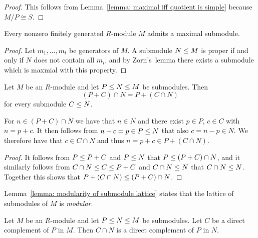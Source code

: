 \begin{proof}
  This follows from Lemma~\ref{lemma: maximal iff quotient is simple} because $M/P \cong S$.
\end{proof}


\begin{lemma}
  \label{lemma: fg modules contain max submodules}
  Every nonzero finitely generated $R$-module $M$ admits a maximal submodule.
\end{lemma}


\begin{proof}
  Let $m_1, \dotsc, m_t$ be generators of $M$.
  A submodule $N \leq M$ is proper if and only if $N$ does not contain all $m_i$, and by Zorn’s~lemma there exists a submodule which is maxmial with this property.
\end{proof}


\begin{lemma}
  \label{lemma: modularity of submodule lattice}
  Let $M$ be an $R$-module and let $P \leq N \leq M$ be submodules.
  Then
  \[
      (P + C) \cap N
    = P + (C \cap N)
  \]
  for every submodule $C \leq N$.
  
  For $n \in (P + C) \cap N$ we have that $n \in N$ and there exist $p \in P$, $c \in C$ with $n = p + c$.
  It then follows from $n - c = p \in P \leq N$ that also $c = n - p \in N$.
  We therefore have that $c \in C \cap N$ and thus $n = p + c \in P + (C \cap N)$.
\end{lemma}


\begin{proof}
  It follows from $P \leq P + C$ and $P \leq N$ that $P \leq (P + C) \cap N$, and it similarly follows from $C \cap N \leq C \leq P + C$ and $C \cap N \leq N$ that $C \cap N \leq N$.
  Together this shows that $P + (C \cap N) \leq (P + C) \cap N$.
\end{proof}


\begin{remark}
  Lemma~\ref{lemma: modularity of submodule lattice} states that the lattice of submodules of $M$ is \emph{modular}.
\end{remark}


\begin{corollary}
  \label{corollary: direct complements in submodules}
  Let $M$ be an $R$-module and let $P \leq N \leq M$ be submodules.
  Let $C$ be a direct complement of $P$ in $M$.
  Then $C \cap N$ is a direct complement of $P$ in $N$.
\end{corollary}


